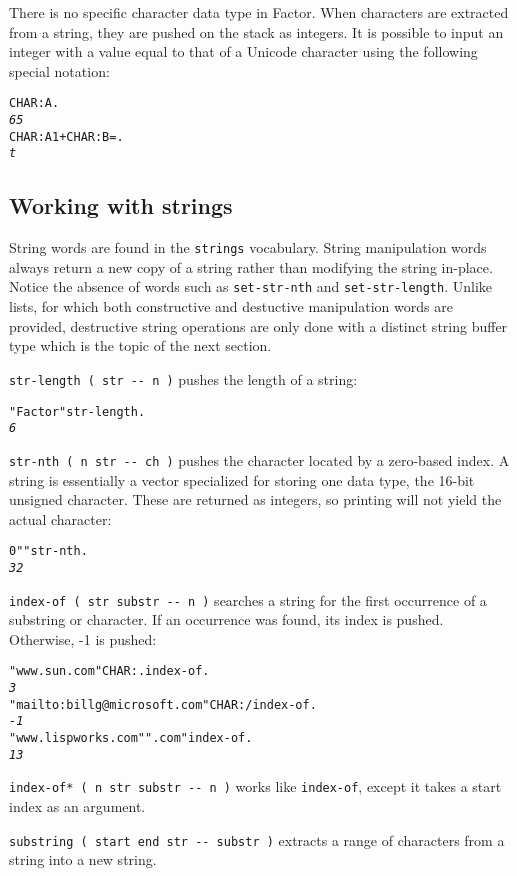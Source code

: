 \documentclass[english]{article}
\begin{document}
There is no specific character data type in Factor. When characters
are extracted from a string, they are pushed on the stack as integers.
It is possible to input an integer with a value equal to that of a
Unicode character using the following special notation:

\begin{alltt}
CHAR: A .
\emph{65}
CHAR: A 1 + CHAR: B = .
\emph{t}
\end{alltt}

\subsection{Working with strings}

String words are found in the \texttt{strings} vocabulary. String
manipulation words always return a new copy of a string rather than
modifying the string in-place. Notice the absence of words such as
\texttt{set-str-nth} and \texttt{set-str-length}. Unlike lists, for
which both constructive and destuctive manipulation words are provided,
destructive string operations are only done with a distinct string
buffer type which is the topic of the next section.

\texttt{str-length ( str -{}- n )} pushes the length of a string:

\begin{alltt}
"Factor" str-length .
\emph{6}
\end{alltt}
\texttt{str-nth ( n str -{}- ch )} pushes the character located by
a zero-based index. A string is essentially a vector specialized for
storing one data type, the 16-bit unsigned character. These are returned
as integers, so printing will not yield the actual character:
\begin{alltt}
0 " " str-nth .
\emph{32}
\end{alltt}
\texttt{index-of ( str substr -{}- n )} searches a string for the
first occurrence of a substring or character. If an occurrence was
found, its index is pushed. Otherwise, -1 is pushed:

\begin{alltt}
"www.sun.com" CHAR: . index-of .
\emph{3}
"mailto:billg@microsoft.com" CHAR: / index-of .
\emph{-1}
"www.lispworks.com" ".com" index-of .
\emph{13}
\end{alltt}
\texttt{index-of{*} ( n str substr -{}- n )} works like \texttt{index-of},
except it takes a start index as an argument.

\texttt{substring ( start end str -{}- substr )} extracts a range
of characters from a string into a new string.
\end{document}
